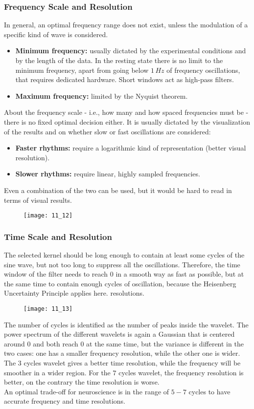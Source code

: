 \subsubsection{Frequency Scale and Resolution}
In general, an optimal frequency range does not exist, unless the modulation of a specific kind of wave is
considered.
\begin{itemize}
    \item \textbf{Minimum frequency:} usually dictated by the experimental conditions and by the length of the
    data. In the resting state there is no limit to the minimum frequency, apart from going below \(1\,Hz\)
    of frequency oscillations, that requires dedicated hardware. Short windows act as high-pass filters.
    \item \textbf{Maximum frequency:} limited by the Nyquist theorem.
\end{itemize}
About the frequency scale - i.e., how many and how spaced frequencies must be - there is no fixed optimal
decision either. It is usually dictated by the visualization of the results and on whether slow or fast
oscillations are considered:
\begin{itemize}
    \item \textbf{Faster rhythms:} require a logarithmic kind of representation (better visual resolution).
    \item \textbf{Slower rhythms:} require linear, highly sampled frequencies.
\end{itemize}
Even a combination of the two can be used, but it would be hard to read in terms of visual results.
\begin{figure}[H]
    \texttt{[image: 11\_12]}
    \centering
\end{figure}
\subsubsection{Time Scale and Resolution}
The selected kernel should be long enough to contain at least some cycles of the sine wave, but not too long
to suppress all the oscillations. Therefore, the time window of the filter needs to reach 0 in a smooth way
as fast as possible, but at the same time to contain enough cycles of oscillation, because the Heisenberg
Uncertainty Principle applies here.
resolutions.
\begin{figure}[H]
    \texttt{[image: 11\_13]}
    \centering
\end{figure}
The number of cycles is identified as the number of peaks inside the
wavelet. The power spectrum of the different wavelets is again a Gaussian that is centered around 0 and both
reach 0 at the same time, but the variance is different in the two cases: one has a smaller frequency
resolution, while the other one is wider. The \(3\) cycles wavelet gives a better time resolution, while the
frequency will be smoother in a wider region. For the \(7\) cycles wavelet, the frequency resolution is better, on
the contrary the time resolution is worse.\\
An optimal trade-off for neuroscience is in the range of \(5-7\) cycles to have accurate frequency and time
resolutions.

